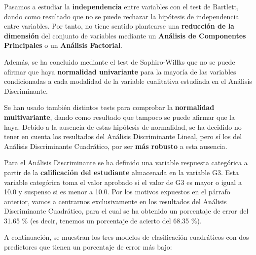 \documentclass[a4paper, 11pt]{article}
\begin{document}
Pasamos a estudiar la \textbf{independencia} entre variables con el test de Bartlett, dando como resultado que no se puede rechazar la hipótesis de independencia entre variables. Por tanto, no tiene sentido plantearse una \textbf{reducción de la dimensión} del conjunto de variables mediante un \textbf{Análisis de Componentes Principales} o un \textbf{Análisis Factorial}.


Además, se ha concluido mediante el test de Saphiro-Willks que no se puede afirmar que haya \textbf{normalidad univariante} para la mayoría de las variables condicionadas a cada modalidad de la variable cualitativa estudiada en el Análisis Discriminante.

Se han usado también distintos tests para comprobar la \textbf{normalidad multivariante}, dando como resultado que tampoco se puede afirmar que la haya. Debido a la ausencia de estas hipótesis de normalidad, se ha decidido no tener en cuenta los resultados del Análisis Discriminante Lineal, pero sí los del Análisis Discriminante Cuadrático, por ser \textbf{más robusto} a esta ausencia.

Para el Análisis Discriminante se ha definido una variable respuesta categórica a partir de la \textbf{calificación del estudiante} almacenada en la variable G3. Esta variable categórica toma el valor aprobado si el valor de G3 es mayor o igual a 10.0 y suspenso si es menor a 10.0. Por los motivos expuestos en el párrafo anterior, vamos a centrarnos exclusivamente en los resultados del Análisis Discriminante Cuadrático, para el cual se ha obtenido un porcentaje de error del 31.65 \% (es decir, tenemos un porcentaje de acierto del 68.35 \%).

A continuación, se muestran los tres modelos de clasificación cuadráticos con dos predictores que tienen un porcentaje de error más bajo:
\end{document}
